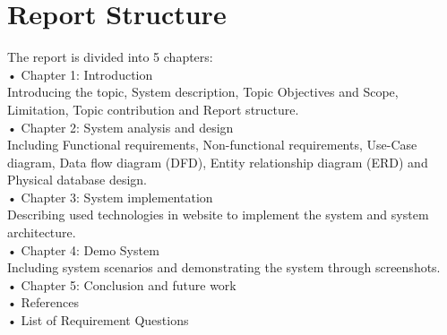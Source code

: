     \section{Report Structure}
    The report is divided into 5 chapters:\\
        \indent• Chapter 1: Introduction\\
        \indent Introducing the topic, System description, Topic Objectives and Scope, Limitation, Topic contribution and Report structure.\\
        \indent• Chapter 2: System analysis and design\\
        \indent Including Functional requirements, Non-functional requirements, Use-Case diagram, Data flow diagram (DFD), Entity relationship diagram (ERD) and Physical database design.\\
        \indent• Chapter 3: System implementation\\
        \indent Describing used technologies in website to implement the system and system architecture. \\
        \indent• Chapter 4: Demo System \\
        \indent Including system scenarios and demonstrating the system through screenshots. \\
        \indent• Chapter 5: Conclusion and future work\\
        \indent• References \\
        \indent• List of Requirement Questions